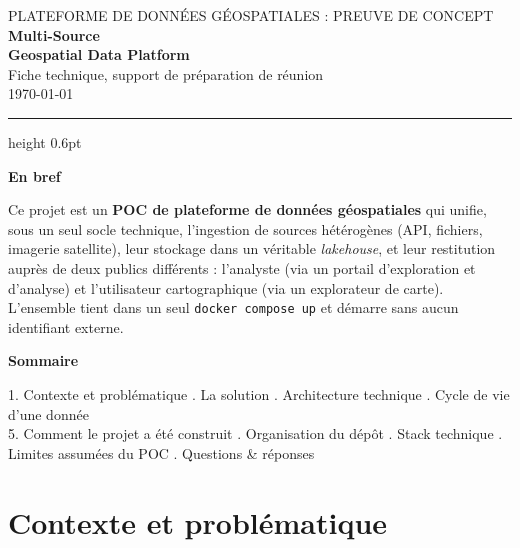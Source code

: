 \documentclass[11pt,a4paper]{article}
\begin{document}
\thispagestyle{plain}

\begin{center}
\vspace*{6pt}
{\headingfont\footnotesize\color{teal}\MakeUppercase{Plateforme de données géospatiales : preuve de concept}}\\[10pt]
{\headingfont\huge\bfseries\color{navy} Multi-Source\\[2pt] Geospatial Data Platform}\\[16pt]
{\large\color{subtext} Fiche technique, support de préparation de réunion}\\[4pt]
{\small\color{subtext}\today}
\end{center}

\vspace{10pt}
{\color{rule}\hrule height 0.6pt}
\vspace{18pt}

\headingfont\bfseries\color{navy}\large En bref\normalfont\rmfamily\color{darktext}\par\vspace{4pt}
Ce projet est un \textbf{POC de plateforme de données géospatiales} qui unifie, sous un seul socle technique, l'ingestion de sources hétérogènes (API, fichiers, imagerie satellite), leur stockage dans un véritable \emph{lakehouse}, et leur restitution auprès de deux publics différents : l'analyste (via un portail d'exploration et d'analyse) et l'utilisateur cartographique (via un explorateur de carte). L'ensemble tient dans un seul \texttt{docker compose up} et démarre sans aucun identifiant externe.

\vspace{6pt}
\headingfont\bfseries\color{navy}\normalsize Sommaire\normalfont\rmfamily\par\vspace{2pt}
{\small\color{subtext}
1. Contexte et problématique . La solution . Architecture technique . Cycle de vie d'une donnée\\
5. Comment le projet a été construit . Organisation du dépôt . Stack technique . Limites assumées du POC . Questions \& réponses
}

\clearpage

\section{Contexte et problématique}
\end{document}
